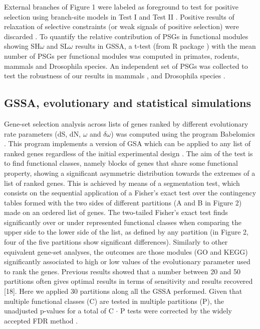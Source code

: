 External branches of Figure 1 were labeled as foreground to test for positive selection using branch-site models in Test I and Test II \cite{Zhang2005}. Positive results of relaxation of selective constraints (or weak signals of positive selection) were discarded \cite{Arbiza2006}. To quantify the relative contribution of PSGs in functional modules showing SH$\omega$ and SL$\omega$ results in GSSA, a t-test (from R package \cite{Ihaka1996}) with the mean number of PSGs per functional modules was computed in primates, rodents, mammals and Drosophila species. An independent set of PSGs was collected to test the robustness of our results in mammals \cite{Kosiol2008a}, and Drosophila species \cite{Clark2007}.

\subsection{GSSA, evolutionary and statistical simulations}

Gene-set selection analysis across lists of genes ranked by different evolutionary rate parameters (dS, dN, $\omega$ and $\delta\omega$) was computed using the program Babelomics \cite{Al-Shahrour2008}. This program implements a version of GSA \cite{Al-Shahrour2005a} which can be applied to any list of ranked genes regardless of the initial experimental design \cite{Dopazo,Huang2009}. The aim of the test is to find functional classes, namely blocks of genes that share some functional property, showing a significant asymmetric distribution towards the extremes of a list of ranked genes. This is achieved by means of a segmentation test, which consists on the sequential application of a Fisher's exact test over the contingency tables formed with the two sides of different partitions (A and B in Figure 2) made on an ordered list of genes. The two-tailed Fisher's exact test finds significantly over or under represented functional classes when comparing the upper side to the lower side of the list, as defined by any partition (in Figure 2, four of the five partitions show significant differences). Similarly to other equivalent gene-set analyses, the outcomes are those modules (GO and KEGG) significantly associated to high or low values of the evolutionary parameter used to rank the genes. Previous results showed that a number between 20 and 50 partitions often gives optimal results in terms of sensitivity and results recovered [18]. Here we applied 30 partitions along all the GSSA performed. Given that multiple functional classes (C) are tested in multiple partitions (P), the unadjusted p-values for a total of C $\cdot$ P tests were corrected by the widely accepted FDR method \cite{Benjamini2001}.

